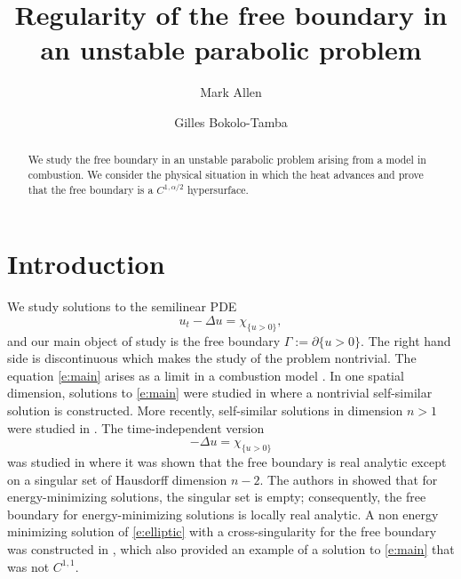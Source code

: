 \documentclass{amsart}
\title{Regularity of the free boundary in an unstable parabolic problem}
\author{Mark Allen}
\author{Gilles Bokolo-Tamba}
\numberwithin{equation}{section}
\begin{document}
\begin{abstract}
    We study the free boundary in an unstable parabolic problem arising from a model in combustion. We consider the physical situation in which the heat advances and prove that the free boundary is a $C^{1,\alpha/2}$ hypersurface. 
\end{abstract}



\maketitle


\section{Introduction}
 We study solutions to the semilinear PDE 
 \begin{equation} \label{e:main}
     u_t - \Delta u = \chi_{\{u>0\}}, 
 \end{equation}
and our main object of study is the free boundary $\Gamma:= \partial \{u>0\}$. The right hand side is discontinuous which makes the study of the problem nontrivial. 
 The equation \eqref{e:main} arises as a limit in a combustion model \cite{ns89}. In one spatial dimension, solutions to \eqref{e:main} were studied in \cite{gh92} where a nontrivial self-similar solution is constructed. More recently, self-similar solutions in dimension $n>1$ were studied in \cite{fg24}. The time-independent version 
 \begin{equation} \label{e:elliptic}
 -\Delta u = \chi_{\{u>0\}}
 \end{equation}
  was studied in \cite{mw07} where it was shown that the free boundary is real analytic except on a singular set of Hausdorff dimension $n-2$. 
  The authors in \cite{mw07} showed that for energy-minimizing solutions, the singular set is empty; consequently, the free boundary for energy-minimizing solutions is locally real analytic. 
  A non energy minimizing solution of \eqref{e:elliptic} with a cross-singularity for the free boundary was constructed in \cite{aw06}, which also provided an example of a solution to \eqref{e:main} that was not $C^{1,1}$. 
\end{document}
